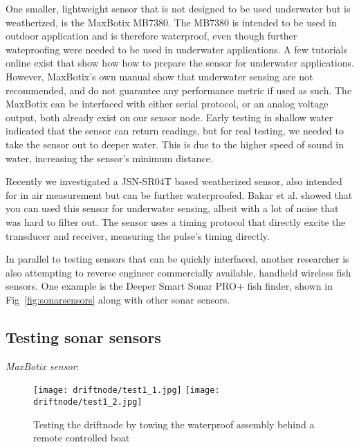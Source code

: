 One smaller, lightweight sensor that is not designed to be used underwater but is weatherized, is the MaxBotix MB7380.
The MB7380 is intended to be used in outdoor application and is therefore waterproof, even though further wateproofing were needed to be used in underwater applications.
A few tutorials online exist that show how how to prepare the sensor for underwater applications.
However, MaxBotix's own manual show that underwater sensing are not recommended, and do not guarantee any performance metric if used as such.
The MaxBotix can be interfaced with either serial protocol, or an analog voltage output, both already exist on our sensor node.
Early testing in shallow water indicated that the sensor can return readings, but for real testing, we needed to take the sensor out to deeper water.
This is due to the higher speed of sound in water, increasing the sensor's minimum distance.

Recently we investigated a JSN-SR04T based weatherized sensor, also intended for in air measurement but can be further waterproofed.
Bakar et al. \cite{bakarsonar} showed that you can used this sensor for underwater sensing, albeit with a lot of noise that was hard to filter out.
The sensor uses a timing protocol that directly excite the transducer and receiver, measuring the pulse's timing directly.

In parallel to testing sensors that can be quickly interfaced, another researcher is also attempting to reverse engineer commercially available, handheld wireless fish sensors.
One example is the Deeper Smart Sonar PRO+ fish finder, shown in Fig~\ref{fig:sonarsensors} along with other sonar sensors.

\subsection[Testing]{Testing sonar sensors}

\noindent  \emph{MaxBotix sensor}:

\begin{figure}[h]
	\begin{center}
	\texttt{[image: driftnode/test1\_1.jpg]}
	\texttt{[image: driftnode/test1\_2.jpg]}
	\caption[MaxBotix first test]{
		Testing the driftnode by towing the waterproof assembly behind a remote controlled boat
	} \label{fig:boattest}
	\end{center}
	\vspace{-1em}
\end{figure}

